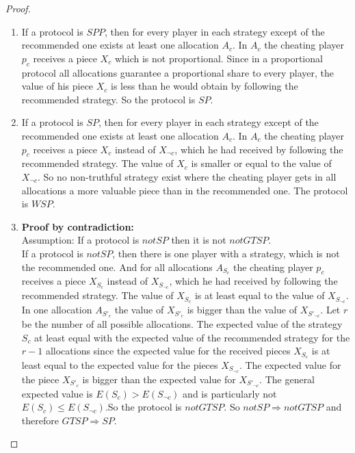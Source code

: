 \begin{proof}
\textcolor{white}{x}
\begin{enumerate}
\item If a protocol is $SPP$, then for every player in each strategy except of the recommended one exists at least one allocation $A_c$. In $A_c$ the cheating player $p_c$ receives a piece $X_c$ which is not proportional. Since in a proportional protocol all allocations guarantee a proportional share to every player, the value of his piece $X_c$ is less than he would obtain by following the recommended strategy. So the protocol is $SP$.   
\item If a protocol is $SP$, then for every player in each strategy except of the recommended one exists at least one allocation $A_c$. In $A_c$ the cheating player $p_c$ receives a piece $X_{c}$ instead of $X_{\neg c}$, which he had received by following the recommended strategy. The value of $X_c$ is smaller or equal to the value of $X_{\neg c}$. So no non-truthful strategy exist where the cheating player gets in all allocations a more valuable piece than in the recommended one. The protocol is $WSP$.
\item \textbf{Proof by contradiction:}\\
\newline
Assumption: If a protocol is $notSP$ then it is not $notGTSP$.\\
If a protocol is $notSP$, then there is one player with a strategy, which is not the recommended one. And for all allocations $A_{S_c}$ the cheating player $p_c$ receives a piece $X_{S_c}$ instead of $X_{S_{\neg c}}$, which he had received by following the recommended strategy. The value of $X_{S_c}$ is at least equal to the value of $X_{S_{\neg c}}$. In one allocation $A_{S'_c}$ the value of $X_{S'_c}$ is bigger than the value of $X_{S'_{\neg c}}$. Let $r$ be the number of all possible allocations. The expected value of the strategy ${S_c}$ at least equal with the expected value of the recommended strategy for the $r-1$ allocations since the expected value for the received pieces $X_{S_c}$ is at least equal to the expected value for the pieces $X_{S_{\neg c}}$. The expected value for the piece $X_{S'_c}$ is bigger than the expected value for $X_{S'_{\neg c}}$. The general expected value is $E(S_c)>E(S_{\neg c})$ and is particularly not $E(S_c)\leq E(S_{\neg c})$.\blitza So the protocol is $notGTSP$.  
\newline
So $notSP \Rightarrow notGTSP$ and therefore $GTSP \Rightarrow SP$.
\end{enumerate}
\end{proof} 

